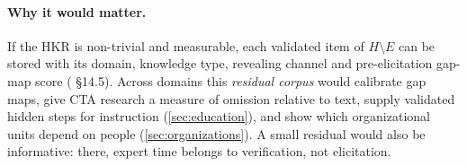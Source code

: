 \paragraph{Why it would matter.} \evhyp{} If the HKR is non-trivial and measurable, each validated item of $H \setminus E$ can be
stored with its domain, knowledge type, revealing channel and pre-elicitation gap-map score
( §14.5). Across domains this \emph{residual corpus} would calibrate gap
maps, give CTA research a measure of omission relative to text, supply validated hidden steps for
instruction (\cref{sec:education}), and show which organizational units depend on people
(\cref{sec:organizations}). \evint{} A small residual would also be informative: there, expert time
belongs to verification, not elicitation.
